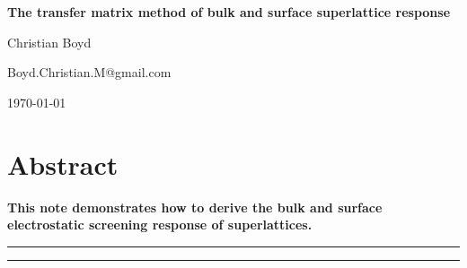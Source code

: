 \begin{center}{\Large \textbf{
The transfer matrix method of bulk and surface superlattice response
}}\end{center}

\begin{center}
Christian Boyd
\end{center}

\begin{center}
{\small \sf Boyd.Christian.M@gmail.com}
\end{center}

\begin{center}
\today
\end{center}


\section*{Abstract}
{\bf
This note demonstrates how to derive the bulk and surface electrostatic screening response of superlattices.
}

\vspace{10pt}
\noindent\rule{\textwidth}{1pt}
\tableofcontents
\noindent\rule{\textwidth}{1pt}
\vspace{10pt}